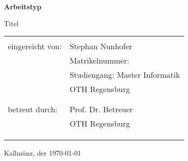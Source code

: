 
\thispagestyle{empty}


\begin{center}


\vspace{4cm}



\noindent 
\textbf{\Huge{Arbeitstyp}}

\vspace{1.5cm}

\noindent 
{\Large{Titel}}


\vspace{3cm}

\begin{tabular}{ll}
\tabularnewline
\tabularnewline
eingereicht von:\hspace{1cm} & Stephan Nunhofer\tabularnewline
 & Matrikelnummer: \tabularnewline
 & Studiengang: Master Informatik\tabularnewline
 & OTH Regensburg\tabularnewline
 & \tabularnewline
 & \tabularnewline
betreut durch: & Prof. Dr. Betreuer\tabularnewline
 & OTH Regensburg\tabularnewline
 & \tabularnewline
 & \tabularnewline
 & \tabularnewline
 
\end{tabular}

\end{center}
\begin{center}
Kallmünz, der \today
\end{center}

\thispagestyle{empty}

\newpage\null\thispagestyle{empty}\newpage